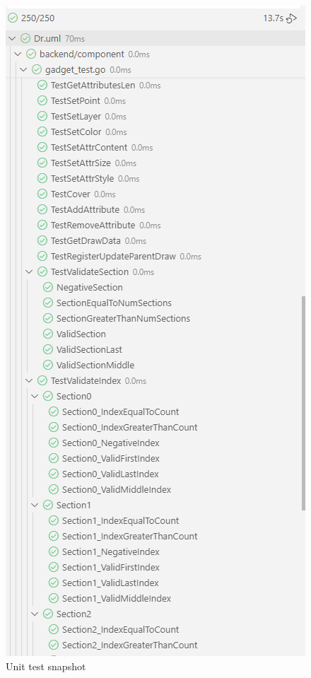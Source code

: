 \documentclass[12pt]{article}
\begin{document}
    \begin{figure}[H]
        \begin{center}
            \includegraphics[width=0.95\linewidth]
            {assets/hw7/cover3.png}
            \caption{Unit test snapshot}
        \end{center}
    \end{figure}
\end{document}

